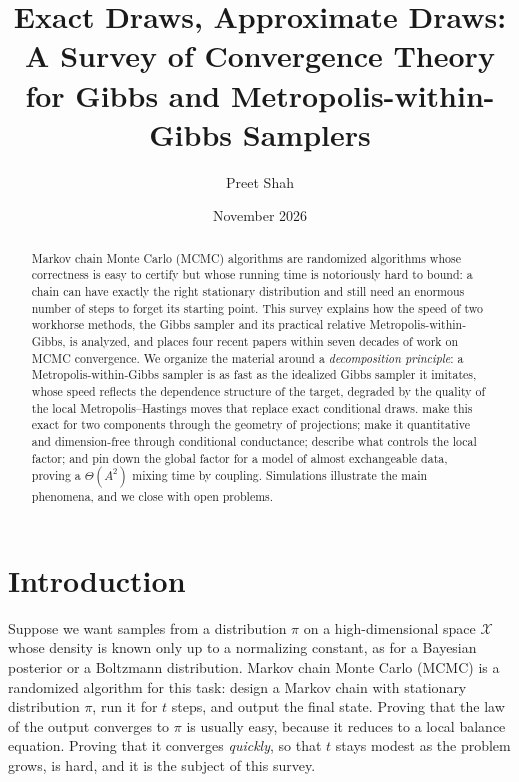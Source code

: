 \documentclass[11pt]{article}
\title{\vspace{-1.2cm}\textbf{Exact Draws, Approximate Draws:}\\[2pt]
\Large A Survey of Convergence Theory for Gibbs and Metropolis-within-Gibbs Samplers}
\author{Preet Shah}
\date{November 2026}
\theoremstyle{remark}
\newcommand{\X}{\mathcal{X}}
\begin{document}
\maketitle

\begin{abstract}
\noindent Markov chain Monte Carlo (MCMC) algorithms are randomized algorithms whose correctness is easy to certify but whose running time is notoriously hard to bound: a chain can have exactly the right stationary distribution and still need an enormous number of steps to forget its starting point. This survey explains how the speed of two workhorse methods, the Gibbs sampler and its practical relative Metropolis-within-Gibbs, is analyzed, and places four recent papers within seven decades of work on MCMC convergence. We organize the material around a \emph{decomposition principle}: a Metropolis-within-Gibbs sampler is as fast as the idealized Gibbs sampler it imitates, whose speed reflects the dependence structure of the target, degraded by the quality of the local Metropolis--Hastings moves that replace exact conditional draws. \citet{qin2022convergence} make this exact for two components through the geometry of projections; \citet{ascolani2026scalability} make it quantitative and dimension-free through conditional conductance; \citet{brown2024convergence} describe what controls the local factor; and \citet{gerencser2023rates} pin down the global factor for a model of almost exchangeable data, proving a $\Theta(A^2)$ mixing time by coupling. Simulations illustrate the main phenomena, and we close with open problems.
\end{abstract}

\section{Introduction}\label{sec:intro}

Suppose we want samples from a distribution $\pi$ on a high-dimensional space $\X$ whose density is known only up to a normalizing constant, as for a Bayesian posterior or a Boltzmann distribution. Markov chain Monte Carlo (MCMC) is a randomized algorithm for this task: design a Markov chain with stationary distribution $\pi$, run it for $t$ steps, and output the final state. Proving that the law of the output converges to $\pi$ is usually easy, because it reduces to a local balance equation. Proving that it converges \emph{quickly}, so that $t$ stays modest as the problem grows, is hard, and it is the subject of this survey.
\end{document}
